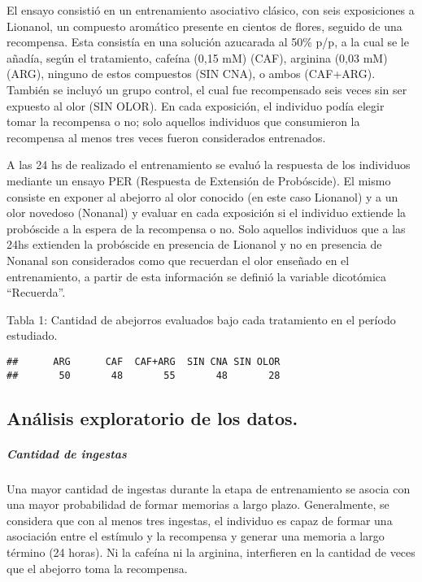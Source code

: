 \documentclass[
  11pt,
]{article}
\begin{document}
El ensayo consistió en un entrenamiento asociativo clásico, con seis
exposiciones a Lionanol, un compuesto aromático presente en cientos de
flores, seguido de una recompensa. Esta consistía en una solución
azucarada al 50\% p/p, a la cual se le añadía, según el tratamiento,
cafeína (0,15 mM) (CAF), arginina (0,03 mM) (ARG), ninguno de estos
compuestos (SIN CNA), o ambos (CAF+ARG). También se incluyó un grupo
control, el cual fue recompensado seis veces sin ser expuesto al olor
(SIN OLOR). En cada exposición, el individuo podía elegir tomar la
recompensa o no; solo aquellos individuos que consumieron la recompensa
al menos tres veces fueron considerados entrenados.

A las 24 hs de realizado el entrenamiento se evaluó la respuesta de los
individuos mediante un ensayo PER (Respuesta de Extensión de
Probóscide). El mismo consiste en exponer al abejorro al olor conocido
(en este caso Lionanol) y a un olor novedoso (Nonanal) y evaluar en cada
exposición si el individuo extiende la probóscide a la espera de la
recompensa o no. Solo aquellos individuos que a las 24hs extienden la
probóscide en presencia de Lionanol y no en presencia de Nonanal son
considerados como que recuerdan el olor enseñado en el entrenamiento, a
partir de esta información se definió la variable dicotómica
``Recuerda''.

Tabla 1: Cantidad de abejorros evaluados bajo cada tratamiento en el
período estudiado.

\begin{verbatim}
##      ARG      CAF  CAF+ARG  SIN CNA SIN OLOR 
##       50       48       55       48       28
\end{verbatim}

\subsection{Análisis exploratorio de los
datos.}\label{anuxe1lisis-exploratorio-de-los-datos.}

\subparagraph{Cantidad de ingestas}\label{cantidad-de-ingestas}

Una mayor cantidad de ingestas durante la etapa de entrenamiento se
asocia con una mayor probabilidad de formar memorias a largo plazo.
Generalmente, se considera que con al menos tres ingestas, el individuo
es capaz de formar una asociación entre el estímulo y la recompensa y
generar una memoria a largo término (24 horas). Ni la cafeína ni la
arginina, interfieren en la cantidad de veces que el abejorro toma la
recompensa.
\end{document}
